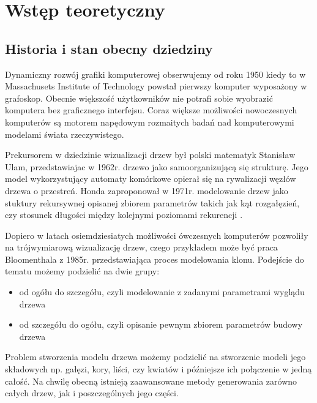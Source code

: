 \chapter{Wstęp teoretyczny}



\section{Historia i stan obecny dziedziny}
Dynamiczny rozwój grafiki komputerowej obserwujemy od roku 1950 kiedy to w Massachusets Institute of Technology \cite{jankowski} powstał pierwszy
komputer wyposażony w grafoskop. Obecnie większość użytkowników nie potrafi sobie wyobrazić komputera bez graficznego interfejsu.
Coraz większe możliwości nowoczesnych komputerów są motorem napędowym rozmaitych badań nad komputerowymi modelami świata rzeczywistego.

Prekursorem w dziedzinie wizualizacji drzew był polski matematyk Stanisław Ulam, przedstawiajac w 1962r. \cite{ulam} drzewo jako samoorganizującą się
strukturę. Jego model wykorzystujący automaty komórkowe opierał się na rywalizacji węzłów  drzewa o przestreń.
Honda zaproponował w 1971r. modelowanie drzew jako stuktury rekursywnej opisanej
zbiorem parametrów takich jak kąt rozgałęzień, czy stosunek długości między kolejnymi poziomami rekurencji \cite{honda}.

Dopiero w latach osiemdziesiatych
możliwości ówczesnych komputerów pozwoliły na trójwymiarową wizualizację drzew, czego przykładem może być praca Bloomenthala z 1985r. \cite{bloomenthal}
przedstawiająca proces modelowania klonu. Podejście do tematu możemy podzielić na dwie grupy:
\begin{itemize}
\item od ogółu do szczegółu, czyli modelowanie z zadanymi parametrami wyglądu drzewa
\item od szczegółu do ogółu, czyli opisanie pewnym zbiorem parametrów budowy drzewa
\end{itemize}
Problem stworzenia modelu drzewa możemy podzielić na stworzenie modeli jego składowych np. gałęzi, kory, liści, czy kwiatów i późniejsze
ich połączenie w jedną całość. Na chwilę obecną istnieją zaawansowane metody generowania zarówno całych drzew, jak i poszczególnych jego części.

